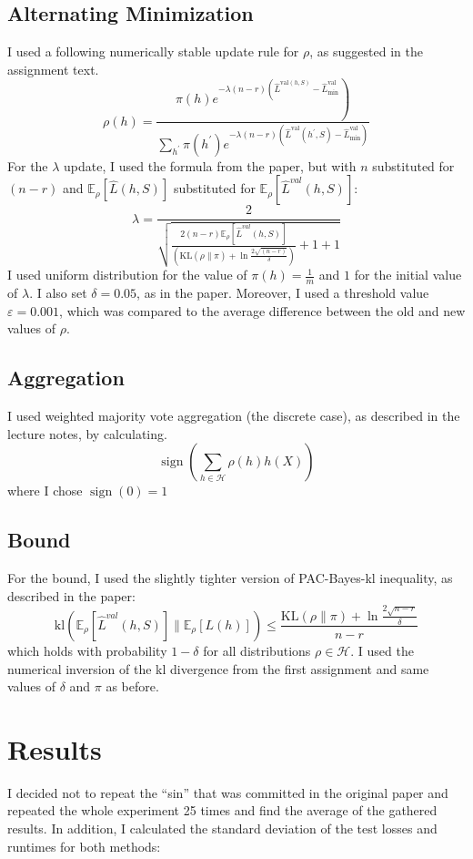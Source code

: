 \documentclass[a4paper]{article}
\begin{document}
\subsection{Alternating Minimization}
I used a following numerically stable
update rule for $\rho$, as suggested in the assignment text.
\[
\rho(h) = 
\frac{\left.\pi(h) e^{-\lambda(n-r)\left(\hat{L}^{\mathrm{val}(h, S)}-\hat{L}_{\mathrm{min}}^{\mathrm{val}}\right.}\right)}{\sum_{h^{\prime}} \pi\left(h^{\prime}\right) e^{-\lambda(n-r)\left(\hat{L}^{\mathrm{val}}\left(h^{\prime}, S\right)-\hat{L}_{\mathrm{min}}^{\mathrm{val}}\right)}}
\]
For the $\lambda$ update, I used the formula from the paper, but with $n$
substituted for $(n-r)$ and $\mathbb{E}_{\rho}[\hat{L}(h,S)]$ substituted for 
$\mathbb{E}_{\rho}[\hat{L}^{val}(h,S)]$:
\[
\lambda=\frac{2}{\sqrt{\frac{2(n-r) \mathbb{E}_{\rho}[\hat{L}^{val}(h,S)]}
    {\left(\mathrm{KL}(\rho \| \pi)+\ln \frac{2
        \sqrt{(n-r)}}{\delta}\right)}+1+1}}
\]
I used uniform distribution for the value of $\pi(h)=\frac{1}{m}$ and $1$ for
the initial value of $\lambda$. I also set $\delta = 0.05$, as in the paper.
Moreover, I used a threshold value $\varepsilon = 0.001$, which was compared to
the average difference between the old and new values of $\rho$.

\subsection{Aggregation}
I used weighted majority vote aggregation (the discrete case), as described
in the lecture notes, by calculating.
\[
\operatorname{sign}\left(\sum_{h \in \mathcal{H}} \rho(h) h(X)\right)
\]
where I chose $\operatorname{sign}(0)=1$

\subsection{Bound}
For the bound, I used the slightly tighter version of PAC-Bayes-kl inequality,
as described in the paper:
\[
\mathrm{kl}\left(\mathbb{E}_{\rho}[\hat{L}^{val}(h, S)] \|
\mathbb{E}_{\rho}[L(h)]\right) \leq \frac{\mathrm{KL}(\rho \| \pi)+\ln \frac{2
    \sqrt{n-r}}{\delta}}{n-r}
\]
which holds with probability $1 - \delta$ for all distributions $\rho \in
\mathcal{H}$. I used the numerical inversion of the kl divergence from the first
assignment and same values of $\delta$ and $\pi$ as before.

\section{Results}
I decided not to repeat the ``sin'' that was committed in the original paper and
repeated the whole experiment 25 times and find the average of the gathered
results. In addition, I calculated the standard deviation of the test losses and
runtimes for both methods:
\end{document}
